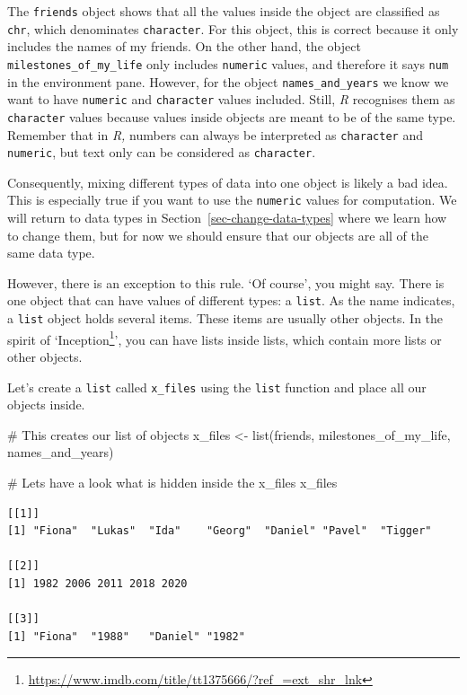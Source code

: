 \documentclass[
  letterpaper,
]{krantz}
\makeatletter
\newenvironment{Shaded}{\begin{snugshade}}{\end{snugshade}}
\newcommand{\CommentTok}[1]{\textcolor[rgb]{0.37,0.37,0.37}{#1}}
\newcommand{\FunctionTok}[1]{\textcolor[rgb]{0.28,0.35,0.67}{#1}}
\newcommand{\NormalTok}[1]{\textcolor[rgb]{0.00,0.23,0.31}{#1}}
\newcommand{\OtherTok}[1]{\textcolor[rgb]{0.00,0.23,0.31}{#1}}
\renewcommand{\href}[2]{#2\footnote{\url{#1}}}
\newenvironment{kframe}{%
\medskip{}
\setlength{\fboxsep}{.8em}
 \def\at@end@of@kframe{}%
 \ifinner\ifhmode%
  \def\at@end@of@kframe{\end{minipage}}%
  \begin{minipage}{\columnwidth}%
 \fi\fi%
 \def\FrameCommand##1{\hskip\@totalleftmargin \hskip-\fboxsep
 \colorbox{shadecolor}{##1}\hskip-\fboxsep
     \hskip-\linewidth \hskip-\@totalleftmargin \hskip\columnwidth}%
 \MakeFramed {\advance\hsize-\width
   \@totalleftmargin\z@ \linewidth\hsize
   \@setminipage}}%
 {\par\unskip\endMakeFramed%
 \at@end@of@kframe}
\renewenvironment{Shaded}{\begin{kframe}}{\end{kframe}}
\makeatother
\begin{document}
The \texttt{friends} object shows that all the values inside the object
are classified as \texttt{chr}, which denominates \texttt{character}.
For this object, this is correct because it only includes the names of
my friends. On the other hand, the object
\texttt{milestones\_of\_my\_life} only includes \texttt{numeric} values,
and therefore it says \texttt{num} in the environment pane. However, for
the object \texttt{names\_and\_years} we know we want to have
\texttt{numeric} and \texttt{character} values included. Still, \emph{R}
recognises them as \texttt{character} values because values inside
objects are meant to be of the same type. Remember that in \emph{R,}
numbers can always be interpreted as \texttt{character} and
\texttt{numeric}, but text only can be considered as \texttt{character}.

Consequently, mixing different types of data into one object is likely a
bad idea. This is especially true if you want to use the
\texttt{numeric} values for computation. We will return to data types in
Section~\ref{sec-change-data-types} where we learn how to change them,
but for now we should ensure that our objects are all of the same data
type.

However, there is an exception to this rule. `Of course', you might say.
There is one object that can have values of different types: a
\texttt{list}. As the name indicates, a \texttt{list} object holds
several items. These items are usually other objects. In the spirit of
`\href{https://www.imdb.com/title/tt1375666/?ref_=ext_shr_lnk}{Inception}',
you can have lists inside lists, which contain more lists or other
objects.

Let's create a \texttt{list} called \texttt{x\_files} using the
\texttt{list} function and place all our objects inside.

\begin{Shaded}
\begin{Highlighting}[]
\CommentTok{\# This creates our list of objects}
\NormalTok{x\_files }\OtherTok{\textless{}{-}} \FunctionTok{list}\NormalTok{(friends,}
\NormalTok{                milestones\_of\_my\_life,}
\NormalTok{                names\_and\_years)}

\CommentTok{\# Let\textquotesingle{}s have a look what is hidden inside the x\_files}
\NormalTok{x\_files}
\end{Highlighting}
\end{Shaded}

\begin{verbatim}
[[1]]
[1] "Fiona"  "Lukas"  "Ida"    "Georg"  "Daniel" "Pavel"  "Tigger"

[[2]]
[1] 1982 2006 2011 2018 2020

[[3]]
[1] "Fiona"  "1988"   "Daniel" "1982"  
\end{verbatim}
\end{document}
